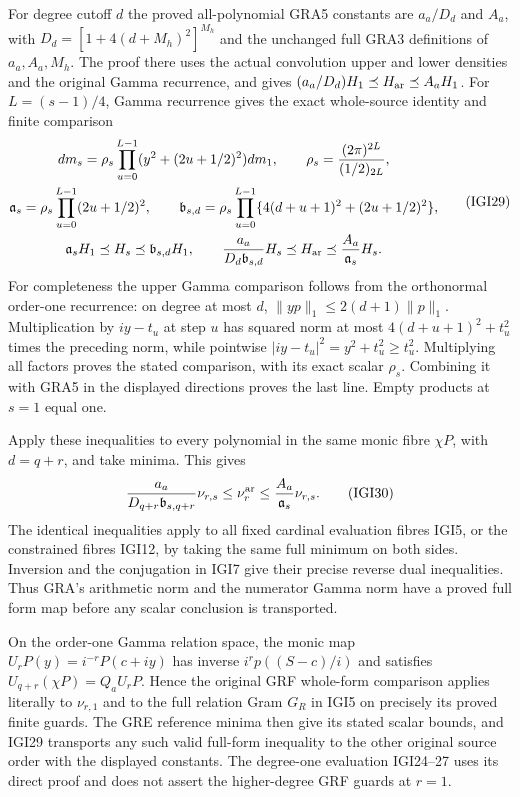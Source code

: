 \documentclass[11pt,a4paper]{article}
\begin{document}
For degree cutoff $d$ the proved all-polynomial GRA5 constants
are $a_a/D_d$ and $A_a$, with
$D_d=[1+4(d+M_h)^2]^{M_h}$ and the unchanged full GRA3
definitions of $a_a,A_a,M_h$. The proof there uses the actual
convolution upper and lower densities and the original Gamma
recurrence, and gives
$(a_a/D_d)H_1\preceq H_{\rm ar}\preceq A_aH_1$.
For $L=(s-1)/4$, Gamma recurrence gives the exact whole-source
identity and finite comparison
\[
\begin{gathered}
 dm_s=\rho_s\prod_{u=0}^{L-1}(y^2+(2u+1/2)^2)dm_1,
 \qquad\rho_s=\frac{(2\pi)^{2L}}{(1/2)_{2L}},\\
 \mathfrak a_s=\rho_s\prod_{u=0}^{L-1}(2u+1/2)^2,
 \qquad
 \mathfrak b_{s,d}=\rho_s\prod_{u=0}^{L-1}
           \{4(d+u+1)^2+(2u+1/2)^2\},\\
 \mathfrak a_sH_1\preceq H_s\preceq\mathfrak b_{s,d}H_1,
 \qquad
 \frac{a_a}{D_d\mathfrak b_{s,d}}H_s
       \preceq H_{\rm ar}\preceq\frac{A_a}{\mathfrak a_s}H_s.
\end{gathered}                                                    \tag{IGI29}
\]
For completeness the upper Gamma comparison follows from the
orthonormal order-one recurrence: on degree at most $d$,
$\|yp\|_1\le2(d+1)\|p\|_1$. Multiplication by $iy-t_u$
at step $u$ has squared norm at most
$4(d+u+1)^2+t_u^2$ times the preceding norm, while pointwise
$|iy-t_u|^2=y^2+t_u^2\ge t_u^2$. Multiplying all factors proves
the stated comparison, with its exact scalar $\rho_s$.
Combining it with GRA5 in the displayed directions proves the
last line. Empty products at $s=1$ equal one.

Apply these inequalities to every polynomial in the same monic
fibre $\chi P$, with $d=q+r$, and take minima. This gives
\[
 \frac{a_a}{D_{q+r}\mathfrak b_{s,q+r}}\nu_{r,s}
      \le\nu_r^{\rm ar}
      \le\frac{A_a}{\mathfrak a_s}\nu_{r,s}.              \tag{IGI30}
\]
The identical inequalities apply to all fixed cardinal evaluation
fibres IGI5, or the constrained fibres IGI12, by taking the same
full minimum on both sides. Inversion and the conjugation in
IGI7 give their precise reverse dual inequalities. Thus GRA's
arithmetic norm and the numerator Gamma norm have a proved full
form map before any scalar conclusion is transported.

On the order-one Gamma relation space, the monic map
$U_rP(y)=i^{-r}P(c+iy)$ has inverse
$i^rp((S-c)/i)$ and satisfies
$U_{q+r}(\chi P)=Q_aU_rP$. Hence the original GRF whole-form
comparison applies literally to $\nu_{r,1}$ and to the full
relation Gram $G_R$ in IGI5 on precisely its proved finite
guards. The GRE reference minima then give its stated scalar
bounds, and IGI29 transports any such valid full-form inequality
to the other original source order with the displayed constants.
The degree-one evaluation IGI24--27 uses its direct proof and
does not assert the higher-degree GRF guards at $r=1$.
\end{document}
